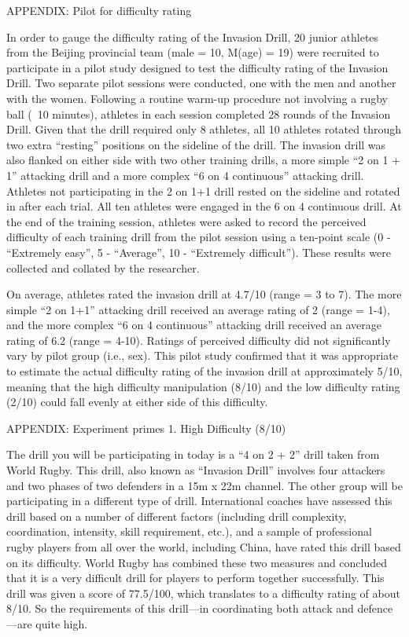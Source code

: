 APPENDIX: Pilot for difficulty rating

In order to gauge the difficulty rating of the Invasion Drill, 20 junior athletes from the Beijing provincial team (male = 10,  M(age) = 19) were recruited to participate in a pilot study designed to test the difficulty rating of the Invasion Drill. Two separate pilot sessions were conducted, one with the men and another with the women. Following a routine warm-up procedure not involving a rugby ball (~10 minutes), athletes in each session completed 28 rounds of the Invasion Drill.  Given that the drill required only 8 athletes, all 10 athletes rotated through two extra ``resting'' positions on the sideline of the drill.  The invasion drill was also flanked on either side with two other  training drills, a more simple ``2 on 1 + 1'' attacking drill and a more complex ``6 on 4 continuous'' attacking drill.  Athletes not participating in the 2 on 1+1 drill rested on the sideline and rotated in after each trial.  All ten athletes were engaged in the 6 on 4 continuous drill. At the end of the training session, athletes were asked to record the perceived difficulty of each training drill from the pilot session using a ten-point scale (0 - ``Extremely easy'', 5 - ``Average'', 10 - ``Extremely difficult''). These results were collected and collated by the researcher.

On average, athletes rated the invasion drill at 4.7/10 (range = 3 to 7).  The more simple ``2 on 1+1'' attacking drill received an average rating of 2 (range = 1-4), and the more complex ``6 on 4 continuous'' attacking drill received an average rating of 6.2 (range = 4-10). Ratings of perceived difficulty did not significantly vary by pilot group (i.e., sex). This pilot study confirmed that it was appropriate to estimate the actual difficulty rating of the invasion drill at approximately 5/10, meaning that the high difficulty manipulation (8/10) and the low difficulty rating (2/10) could fall evenly at either side of this difficulty.


APPENDIX:  Experiment primes
1. High Difficulty (8/10)

The drill you will be participating in today is a ``4 on 2 + 2'' drill taken from World Rugby.  This drill, also known as ``Invasion Drill'' involves four attackers and two phases of two defenders in a 15m x 22m channel.  The other group will be participating in a different type of drill.  International coaches have assessed this drill based on a number of different factors (including drill complexity, coordination, intensity, skill requirement, etc.), and a sample of professional rugby players from all over the world, including China, have rated this drill based on its difficulty.  World Rugby has combined these two measures and concluded that it is a very difficult drill for players to perform together successfully.  This drill was given a score of 77.5/100, which translates to a difficulty rating of about 8/10.  So the requirements of this drill—in coordinating both attack and defence—are quite high.

